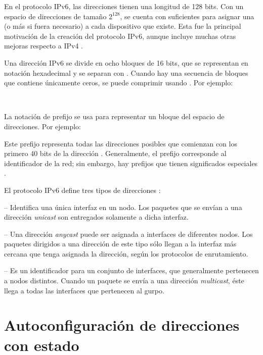 En el protocolo IPv6, las direcciones tienen una longitud de 128 bits. Con un
espacio de direcciones de tamaño $2^128$, se cuenta con suficientes para asignar
una (o más si fuera necesario) a cada dispositivo que existe. Esta fue la
principal motivación de la creación del protocolo IPv6, aunque incluye muchas
otras mejoras respecto a IPv4 \cite{Hagen2006}.

Una dirección IPv6 se divide en ocho bloques de 16 bits, que se representan en
notación hexadecimal y se separan con \code{:}. Cuando hay una secuencia de
bloques que contiene únicamente ceros, se puede comprimir usando \code{::}. Por
ejemplo:

\noindent{}\\

La notación de prefijo se usa para representar un bloque del espacio de
direcciones. Por ejemplo:

\noindent{}

Este prefijo representa todas las direcciones posibles que comienzan con
los primero 40 bits de la dirección . Generalmente, el
prefijo corresponde al identificador de la red; sin embargo, hay prefijos que
tienen significados especiales \cite{Hagen2006}.

El protocolo IPv6 define tres tipos de direcciones \cite{CiscoIpv62011}:

 -- Identifica una única interfaz en un nodo. Los
paquetes que se envían a una dirección \textit{unicast} son entregados
solamente a dicha interfaz.

 -- Una dirección \textit{anycast} puede ser asignada
a interfaces de diferentes nodos. Los paquetes dirigidos a una dirección de este
tipo sólo llegan a la interfaz más cercana que tenga asignada la dirección,
según los protocolos de enrutamiento.

 -- Es un identificador para un conjunto de
interfaces, que generalmente pertenecen a nodos distintos. Cuando un paquete
se envía a una dirección \textit{multicast}, éste llega a todas las interfaces
que pertenecen al gurpo.


\section{Autoconfiguración de direcciones con estado}
\label{sec:autoconfiguracion_de_direcciones_con_estado}

